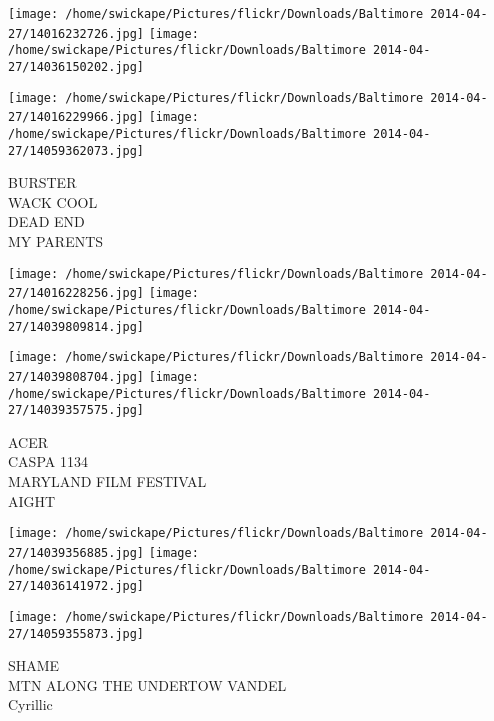 \documentclass[10pt,letterpaper]{article}
\begin{document}
\texttt{[image: /home/swickape/Pictures/flickr/Downloads/Baltimore 2014-04-27/14016232726.jpg]}
\texttt{[image: /home/swickape/Pictures/flickr/Downloads/Baltimore 2014-04-27/14036150202.jpg]}

\texttt{[image: /home/swickape/Pictures/flickr/Downloads/Baltimore 2014-04-27/14016229966.jpg]}
\texttt{[image: /home/swickape/Pictures/flickr/Downloads/Baltimore 2014-04-27/14059362073.jpg]}

BURSTER\\
WACK COOL\\
DEAD END\\
MY PARENTS
\pagebreak

\texttt{[image: /home/swickape/Pictures/flickr/Downloads/Baltimore 2014-04-27/14016228256.jpg]}
\texttt{[image: /home/swickape/Pictures/flickr/Downloads/Baltimore 2014-04-27/14039809814.jpg]}

\texttt{[image: /home/swickape/Pictures/flickr/Downloads/Baltimore 2014-04-27/14039808704.jpg]}
\texttt{[image: /home/swickape/Pictures/flickr/Downloads/Baltimore 2014-04-27/14039357575.jpg]}

ACER\\
CASPA 1134\\
MARYLAND FILM FESTIVAL\\
AIGHT
\pagebreak

\texttt{[image: /home/swickape/Pictures/flickr/Downloads/Baltimore 2014-04-27/14039356885.jpg]}
\texttt{[image: /home/swickape/Pictures/flickr/Downloads/Baltimore 2014-04-27/14036141972.jpg]}

\texttt{[image: /home/swickape/Pictures/flickr/Downloads/Baltimore 2014-04-27/14059355873.jpg]}

SHAME\\
MTN ALONG THE UNDERTOW VANDEL\\
Cyrillic
\pagebreak
\end{document}
